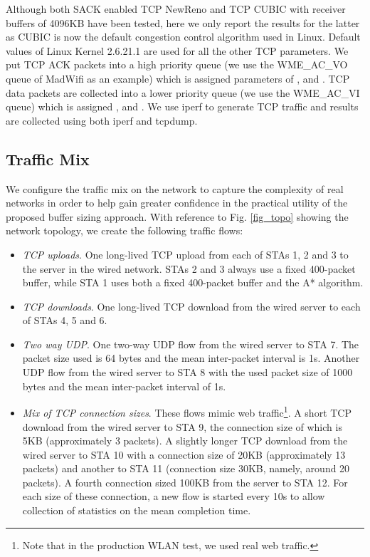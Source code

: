 \documentclass[10pt,twocolumn, journal]{IEEEtran}
\begin{document}
Although both SACK enabled TCP NewReno and TCP CUBIC with receiver buffers of 4096KB have been
tested, here we only report the results for the latter as CUBIC is now the default
congestion control algorithm used in Linux.  Default values of Linux Kernel 2.6.21.1 are
used for all the other TCP parameters. We put TCP ACK packets into a high priority queue
(we use the WME\_AC\_VO queue of MadWifi as an example) which is assigned parameters of
,  and . TCP data packets are collected into a lower
priority queue (we use the WME\_AC\_VI queue) which is assigned ,
 and . We use iperf to generate TCP traffic and results are
collected using both iperf and tcpdump.

\subsection{Traffic Mix}

We configure the traffic mix on the network to capture the complexity of real networks in
order to help gain greater confidence in the practical utility of the proposed buffer
sizing approach.   With reference to Fig. \ref{fig_topo} showing the network topology, we
create the following traffic flows:

\begin{itemize}

\item \emph{TCP uploads}. One long-lived TCP upload from each of STAs 1, 2 and 3 to the
server in the wired network. STAs 2 and 3 always use a fixed 400-packet buffer, while STA
1 uses both a fixed 400-packet buffer and the A* algorithm.

\item \emph{TCP downloads}. One long-lived TCP download from the wired server to each of
STAs 4, 5 and 6.

\item \emph{Two way UDP}.  One two-way UDP flow from the wired server to STA 7. The packet size used is 64 bytes and the mean inter-packet interval is 1s.  Another UDP flow from the wired server to STA 8 with the used packet size of 1000 bytes and the mean inter-packet interval of 1s.

\item \emph{Mix of TCP connection sizes}.  These flows mimic web traffic\footnote{Note that in the production WLAN test, we used real web traffic.}. A short TCP download from the wired server to STA 9, the connection size of which is 5KB (approximately 3 packets).   A slightly longer TCP download from the wired server to STA 10 with a connection size of 20KB (approximately 13 packets) and another to STA 11 (connection size 30KB, namely, around 20 packets).  A fourth connection sized 100KB from the server to STA 12.  For each size of these connection, a new flow is started every 10s to allow collection of statistics on the mean completion time.

\end{itemize}
\end{document}
